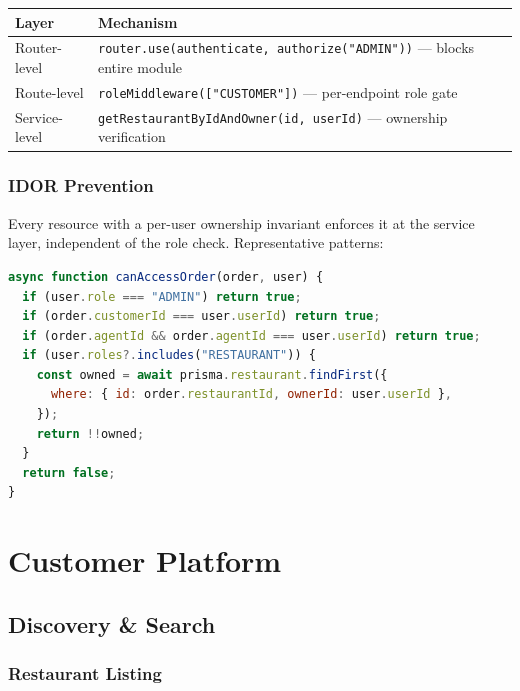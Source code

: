 \documentclass[11pt,a4paper,twoside]{book}
\newcommand{\th}[1]{\textbf{\color{white}#1}}
\begin{document}
\begin{center}\small
\begin{tabular}{p{3cm}p{9.5cm}}
\toprule
\rowcolor{headbg}\th{Layer} & \th{Mechanism} \\
\midrule
Router-level  & \texttt{router.use(authenticate, authorize("ADMIN"))} — blocks entire module \\
\rowcolor{rowalt}Route-level   & \texttt{roleMiddleware(["CUSTOMER"])} — per-endpoint role gate \\
Service-level & \texttt{getRestaurantByIdAndOwner(id, userId)} — ownership verification \\
\bottomrule
\end{tabular}
\end{center}

\subsection{IDOR Prevention}

Every resource with a per-user ownership invariant enforces it at the service
layer, independent of the role check.  Representative patterns:

\begin{lstlisting}[language=JavaScript,caption={Order IDOR gate (orders.controller.js)}]
async function canAccessOrder(order, user) {
  if (user.role === "ADMIN") return true;
  if (order.customerId === user.userId) return true;
  if (order.agentId && order.agentId === user.userId) return true;
  if (user.roles?.includes("RESTAURANT")) {
    const owned = await prisma.restaurant.findFirst({
      where: { id: order.restaurantId, ownerId: user.userId },
    });
    return !!owned;
  }
  return false;
}
\end{lstlisting}

\chapter{Customer Platform}

\section{Discovery \& Search}

\subsection{Restaurant Listing}
\end{document}
